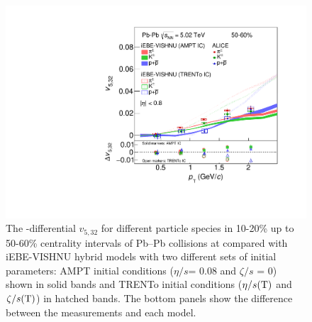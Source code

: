 \begin{figure}[!htb]
\begin{center}
\includegraphics[scale=0.26]{figures/model/TrentoAndAMPT_v523_gap00_new_50-60_PID2.pdf}
\end{center}
\caption{The \pT-differential $v_{5,32}$ for different particle species in 10-20\% up to 50-60\% centrality intervals of Pb--Pb collisions at \sNN compared with iEBE-VISHNU hybrid models with two different sets of initial parameters: AMPT initial conditions ($\eta/s$= 0.08 and $\zeta/s$ = 0) shown in solid bands and TRENTo initial conditions ($\eta/s({\rm T})$ and $\zeta/s({\rm T})$) in hatched bands. The bottom panels show the difference between the measurements and each model.}
\label{v523_model}
\end{figure}


